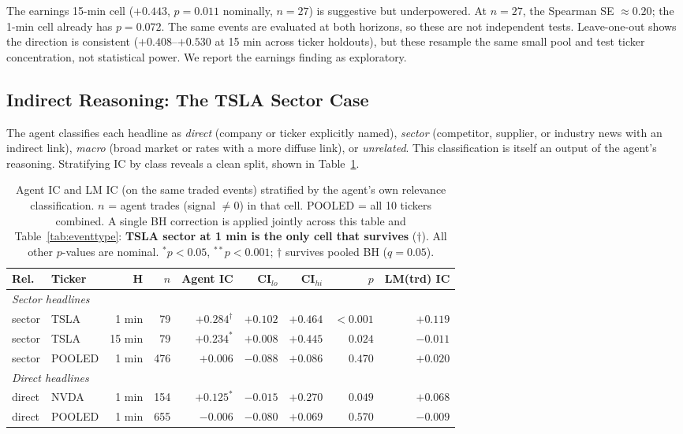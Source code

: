 \documentclass[11pt, letterpaper]{article}
\begin{document}
The earnings 15-min cell ($+0.443$, $p = 0.011$ nominally, $n = 27$) is suggestive
but underpowered. At $n = 27$, the Spearman SE $\approx 0.20$; the 1-min cell already
has $p = 0.072$. The same events are evaluated at both horizons, so these are not
independent tests. Leave-one-out shows the direction is consistent
($+0.408$--$+0.530$ at 15 min across ticker holdouts), but these resample the same
small pool and test ticker concentration, not statistical power. We report the earnings
finding as exploratory.

\subsection{Indirect Reasoning: The TSLA Sector Case}
\label{sec:relevance}

The agent classifies each headline as \textit{direct} (company or ticker explicitly
named), \textit{sector} (competitor, supplier, or industry news with an indirect
link), \textit{macro} (broad market or rates with a more diffuse link), or
\textit{unrelated}. This classification is itself an output of the agent's reasoning.
Stratifying IC by class reveals a clean split, shown in Table~\ref{tab:relevance}.

\begin{table}[h]
\centering
\small
\caption{Agent IC and LM IC (on the same traded events) stratified by the agent's
own relevance classification. $n$ = agent trades (signal $\neq 0$) in that cell.
POOLED = all 10 tickers combined. A single BH correction is applied jointly across
this table and Table~\ref{tab:eventtype}: \textbf{TSLA sector at 1 min is the only
cell that survives} ($\dagger$). All other $p$-values are nominal.
$^* p < 0.05$, $^{**} p < 0.001$; $\dagger$ survives pooled BH ($q = 0.05$).}
\label{tab:relevance}
\begin{tabular}{llrrrrrrr}
\toprule
Rel. & Ticker & H & $n$ & Agent IC & CI$_{lo}$ & CI$_{hi}$ & $p$ & LM(trd) IC \\
\midrule
\multicolumn{9}{l}{\textit{Sector headlines}} \\
sector & TSLA   & 1 min  & 79 & $+0.284^{\dagger}$ & $+0.102$ & $+0.464$ & $<0.001$ & $+0.119$ \\
sector & TSLA   & 15 min & 79 & $+0.234^*$         & $+0.008$ & $+0.445$ & $0.024$  & $-0.011$ \\
sector & POOLED & 1 min  &476 & $+0.006$            & $-0.088$ & $+0.086$ & $0.470$  & $+0.020$ \\
\midrule
\multicolumn{9}{l}{\textit{Direct headlines}} \\
direct & NVDA   & 1 min  &154 & $+0.125^*$ & $-0.015$ & $+0.270$ & $0.049$ & $+0.068$ \\
direct & POOLED & 1 min  &655 & $-0.006$   & $-0.080$ & $+0.069$ & $0.570$ & $-0.009$ \\
\bottomrule
\end{tabular}
\end{table}
\end{document}
